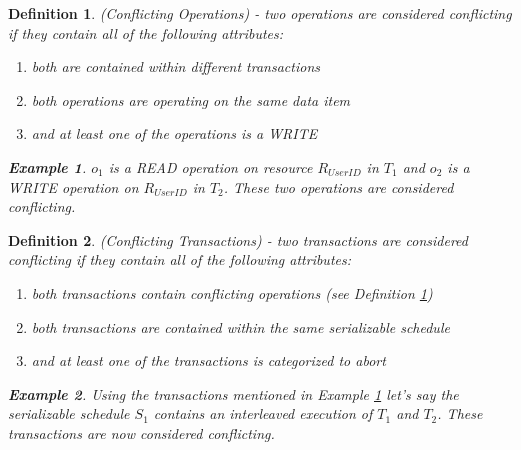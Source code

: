 \documentclass[conference]{IEEEtran}
\newtheorem{definition}{Definition}
\newtheorem{example}{Example}[definition]
\begin{document}
\begin{definition}
\label{conflict_ops}
 (Conflicting Operations) - two operations are considered conflicting if they contain all of the following attributes:

 \begin{enumerate}
   \item both are contained within different transactions
   \item both operations are operating on the same data item
   \item and at least one of the operations is a WRITE
 \end{enumerate}

 \begin{example}
 \label{ex_conflict_ops}
  $o_{1}$ is a READ operation on resource $R_{User ID}$ in $T_{1}$ and $o_{2}$ is a WRITE operation on $R_{User ID}$ in    $T_{2}$. These two operations are considered conflicting.
 \end{example}
\end{definition}

\begin{definition}
\label{conflict_trans}
 (Conflicting Transactions) - two transactions are considered conflicting if they contain all of the following attributes:
 
 \begin{enumerate}
 \item both transactions contain conflicting operations (see Definition \ref{conflict_ops})
 \item both transactions are contained within the same serializable schedule
 \item and at least one of the transactions is categorized to abort
 \end{enumerate}
 
 \begin{example}
 \label{ex_conflict_trans}
  Using the transactions mentioned in Example \ref{ex_conflict_ops} let's say the serializable schedule $S_{1}$ contains   an interleaved execution of $T_{1}$ and $T_{2}$. These transactions are now considered conflicting.
 \end{example}
\end{definition}
\end{document}
